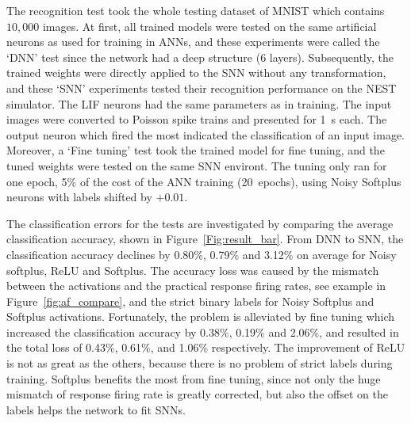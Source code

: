 \documentclass{article}
\begin{document}
The recognition test took the whole testing dataset of MNIST which contains $10,000$ images.
At first, all trained models were tested on the same artificial neurons as used for training in ANNs, and these experiments were called the `DNN' test since the network had a deep structure (6 layers).
Subsequently, the trained weights were directly applied to the SNN without any transformation, and these `SNN' experiments tested their recognition performance on the NEST simulator.
The LIF neurons had the same parameters as in training.
The input images were converted to Poisson spike trains and presented for 1~s each.
The output neuron which fired the most indicated the classification of an input image.
Moreover, a `Fine tuning' test took the trained model for fine tuning, and the tuned weights were tested on the same SNN environt.
The tuning only ran for one epoch, 5\% of the cost of the ANN training (20~epochs), using Noisy Softplus neurons with labels shifted by $+0.01$.

The classification errors for the tests are investigated by comparing the average classification accuracy, shown in Figure~\ref{Fig:result_bar}.
From DNN to SNN, the classification accuracy declines by 0.80\%, 0.79\% and 3.12\% on average for Noisy softplus, ReLU and Softplus.
The accuracy loss was caused by the mismatch between the activations and the practical response firing rates, see example in Figure~\ref{fig:af_compare}, and the strict binary labels for Noisy Softplus and Softplus activations.
Fortunately, the problem is alleviated by fine tuning which increased the classification accuracy by 0.38\%, 0.19\% and 2.06\%, and resulted in the total loss of 0.43\%, 0.61\%, and 1.06\% respectively.
The improvement of ReLU is not as great as the others, because there is no problem of strict labels during training.
Softplus benefits the most from fine tuning, since not only the huge mismatch of response firing rate is greatly corrected, but also the offset on the labels helps the network to fit SNNs. 

\end{document}
